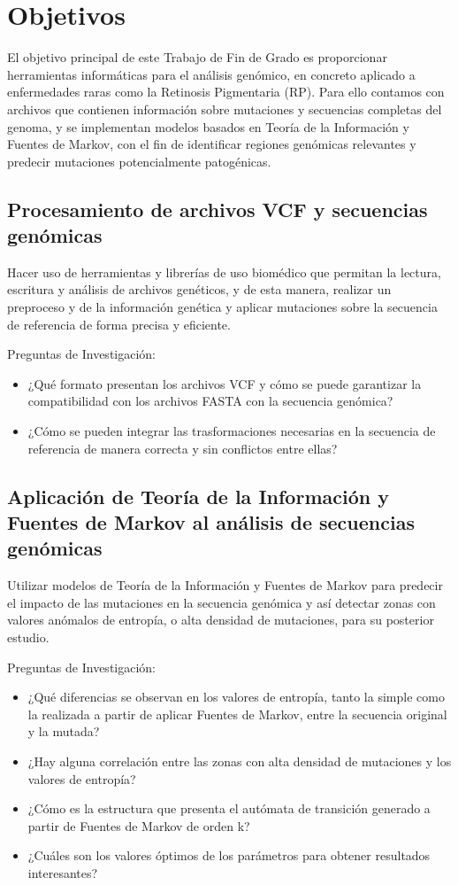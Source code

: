 \documentclass[11pt,spanish,listoffigures,listoftables]{tfgetsinf}
\begin{document}
\section{Objetivos}

El objetivo principal de este Trabajo de Fin de Grado es proporcionar herramientas informáticas para el análisis genómico, en concreto aplicado a enfermedades raras como la Retinosis Pigmentaria (RP). Para ello contamos con archivos que contienen información sobre mutaciones y secuencias completas del genoma, y se implementan modelos basados en Teoría de la Información y Fuentes de Markov, con el fin de identificar regiones genómicas relevantes y predecir mutaciones potencialmente patogénicas.

\subsection{Procesamiento de archivos VCF y secuencias genómicas}

Hacer uso de herramientas y librerías de uso biomédico que permitan la lectura, escritura y análisis de archivos genéticos, y de esta manera, realizar un preproceso y de la información genética y aplicar mutaciones sobre la secuencia de referencia de forma precisa y eficiente.

Preguntas de Investigación: 
\begin{itemize}
\item ¿Qué formato presentan los archivos VCF y cómo se puede garantizar la compatibilidad con los archivos FASTA con la secuencia genómica?
\item ¿Cómo se pueden integrar las trasformaciones necesarias en la secuencia de referencia de manera correcta y sin conflictos entre ellas?
\end{itemize}

\subsection{Aplicación de Teoría de la Información y Fuentes de Markov al análisis de secuencias genómicas }

Utilizar modelos de Teoría de la Información y Fuentes de Markov para predecir el impacto de las mutaciones en la secuencia genómica y así detectar zonas con valores anómalos de entropía, o alta densidad de mutaciones, para su posterior estudio. 

Preguntas de Investigación: 
\begin{itemize}
\item ¿Qué diferencias se observan en los valores de entropía, tanto la simple como la realizada a partir de aplicar Fuentes de Markov, entre la secuencia original y la mutada? 
\item ¿Hay alguna correlación entre las zonas con alta densidad de mutaciones y los valores de entropía? 
\item ¿Cómo es la estructura que presenta el autómata de transición generado a partir de Fuentes de Markov de orden k? 
\item ¿Cuáles son los valores óptimos de los parámetros para obtener resultados interesantes? 
\end{itemize}
\end{document}
